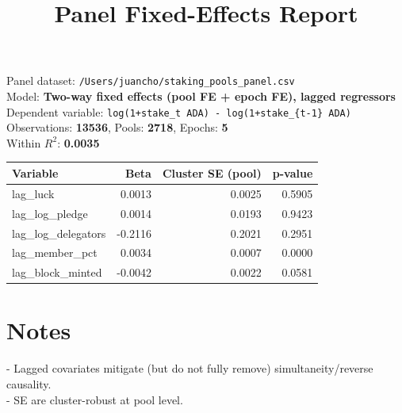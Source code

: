 \documentclass[11pt]{article}
\title{Panel Fixed-Effects Report}
\author{}
\date{}
\begin{document}
\maketitle
Panel dataset: \texttt{/Users/juancho/staking\_pools\_panel.csv}\\
Model: \textbf{Two-way fixed effects (pool FE + epoch FE), lagged regressors}\\
Dependent variable: \texttt{log(1+stake\_t ADA) - log(1+stake\_\{t-1\} ADA)}\\
Observations: \textbf{13536}, Pools: \textbf{2718}, Epochs: \textbf{5}\\
Within $R^2$: \textbf{0.0035}

\begin{table}[h]
\centering
\begin{tabular}{lrrr}
\toprule
Variable & Beta & Cluster SE (pool) & p-value \\
\midrule
lag\_luck & 0.0013 & 0.0025 & 0.5905 \\
lag\_log\_pledge & 0.0014 & 0.0193 & 0.9423 \\
lag\_log\_delegators & -0.2116 & 0.2021 & 0.2951 \\
lag\_member\_pct & 0.0034 & 0.0007 & 0.0000 \\
lag\_block\_minted & -0.0042 & 0.0022 & 0.0581 \\
\bottomrule
\end{tabular}
\end{table}

\section*{Notes}
- Lagged covariates mitigate (but do not fully remove) simultaneity/reverse causality.\\
- SE are cluster-robust at pool level.\\
\end{document}
